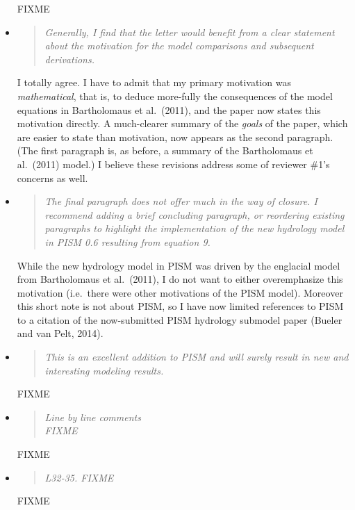 \documentclass[11pt,reqno]{amsart}
\newcommand{\reply}[2]{
\medskip\medskip
\item  \begin{quote}
\emph{#1}
\end{quote}

\medskip
\noindent #2}
\begin{document}
\begin{itemize}
{\begin{itemize}
FIXME
\end{itemize}}

\reply{Generally, I find that the letter would benefit from a clear statement about the motivation for the model comparisons and subsequent derivations.}
{I totally agree.  I have to admit that my primary motivation was \emph{mathematical}, that is, to deduce more-fully the consequences of the model equations in Bartholomaus et al.~(2011), and the paper now states this motivation directly.  A much-clearer summary of the \emph{goals} of the paper, which are easier to state than motivation, now appears as the second paragraph.  (The first paragraph is, as before, a summary of the Bartholomaus et al.~(2011) model.)  I believe these revisions address some of reviewer \#1's concerns as well.}

\reply{The final paragraph does not offer much in the way of closure. I recommend adding a brief concluding paragraph, or reordering existing paragraphs to highlight the implementation of the new hydrology model in PISM 0.6 resulting from equation 9.}
{While the new hydrology model in PISM was driven by the englacial model from Bartholomaus et al.~(2011), I do not want to either overemphasize this motivation (i.e.~there were other motivations of the PISM model).  Moreover this short note is not about PISM, so I have now limited references to PISM to a citation of the now-submitted PISM hydrology submodel paper (Bueler and van Pelt, 2014).}

\reply{This is an excellent addition to PISM and will surely result in new and interesting modeling results.}
{FIXME}

\reply{Line by line comments \smallskip \\
FIXME}
{FIXME}

\reply{L32-35.  FIXME}
{FIXME}
\end{itemize}
\end{document}
